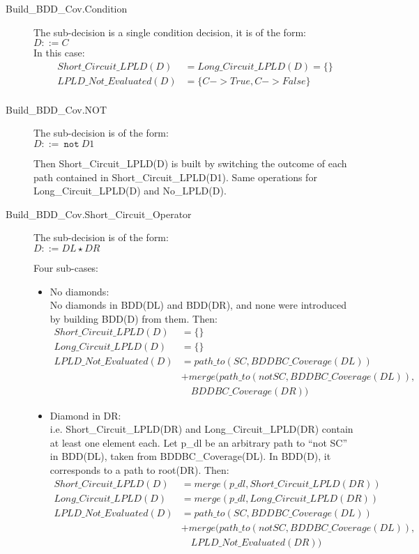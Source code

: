 \documentclass[a4paper,12pt,twoside]{article}
\newcommand{\anysc}{\star}
\newcommand{\adanot}{\texttt{not}}
\begin{document}
\begin{description}
\item[Build\_BDD\_Cov.Condition]
  The sub-decision is a single condition decision, it is of the form:\\
  $D ::= C$\\
  In this case:
  \begin{align*}
    Short\_Circuit\_LPLD(D) & = Long\_Circuit\_LPLD(D) = \{\}\\
    LPLD\_Not\_Evaluated(D) & = \{C -> True, C -> False\}\\
  \end{align*}


\item[Build\_BDD\_Cov.NOT]
  The sub-decision is of the form:\\
  $D ::=\ \adanot{} \ D1$

  Then Short\_Circuit\_LPLD(D) is built by switching the outcome of each
  path contained in Short\_Circuit\_LPLD(D1). Same operations for
  Long\_Circuit\_LPLD(D) and No\_LPLD(D).


\item[Build\_BDD\_Cov.Short\_Circuit\_Operator]
  The sub-decision is of the form:\\
  $D ::= DL \anysc{} DR$

  Four sub-cases:

  \begin{itemize}
  \item No diamonds:\\
    No diamonds in BDD(DL) and BDD(DR), and none were introduced
    by building BDD(D) from them. Then:\\
    \begin{align*}
      Short\_Circuit\_LPLD(D) & = \{\}\\
      Long\_Circuit\_LPLD (D) & = \{\}\\
      LPLD\_Not\_Evaluated(D) & = path\_to(SC, BDDBC\_Coverage(DL))\\
                            & + merge(path\_to(not SC, BDDBC\_Coverage (DL)),\\
                            & \quad BDDBC\_Coverage(DR))
    \end{align*}

  \item Diamond in DR:\\
    i.e. Short\_Circuit\_LPLD(DR) and Long\_Circuit\_LPLD(DR) contain at least
    one element each.
    Let p\_dl be an arbitrary path to ``not SC'' in BDD(DL), taken from
    BDDBC\_Coverage(DL). In BDD(D), it corresponds to a path to root(DR).
    Then:
    \begin{align*}
    Short\_Circuit\_LPLD(D) & = merge({p\_dl}, Short\_Circuit\_LPLD(DR))\\
    Long\_Circuit\_LPLD(D)  & = merge({p\_dl}, Long\_Circuit\_LPLD(DR))\\
    LPLD\_Not\_Evaluated(D) & = path\_to(SC, BDDBC\_Coverage(DL))\\
                          & + merge(path\_to(not SC, BDDBC\_Coverage(DL)),\\
                          & \quad  LPLD\_Not\_Evaluated(DR))
    \end{align*}
  

\end{itemize}
\end{description}
\end{document}
